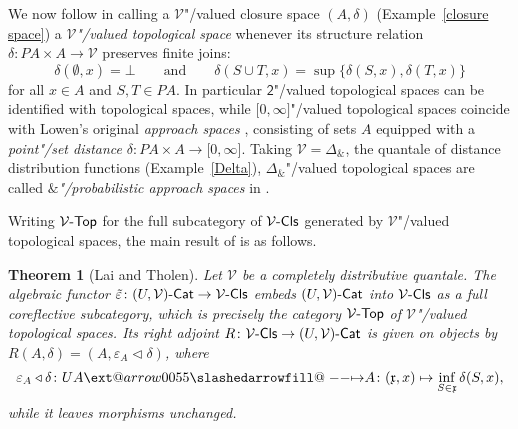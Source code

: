 \documentclass[preprint, a4paper]{elsarticle}
\makeatletter
\def\slashedarrowfill@#1#2#3#4#5{%
  $\m@th\thickmuskip0mu\medmuskip\thickmuskip\thinmuskip\thickmuskip
   \relax#5#1\mkern-7mu%
   \cleaders\hbox{$#5\mkern-2mu#2\mkern-2mu$}\hfill
   \mathclap{#3}\mathclap{#2}%
   \cleaders\hbox{$#5\mkern-2mu#2\mkern-2mu$}\hfill
   \mkern-7mu#4$%
}
\def\rightslashedarrowfill@{%
  \slashedarrowfill@\relbar\relbar\mapstochar\rightarrow}
\newcommand\xslashedrightarrow[2][]{%
  \ext@arrow 0055{\rightslashedarrowfill@}{#1}{#2}}
\def\slashedrightarrow{\xslashedrightarrow{}}
\newtheorem{theorem}{Theorem}[section]
\theoremstyle{definition}
\theoremstyle{remark}
\providecommand{\exref}[1]{Example~\ref{#1}}
\providecommand{\eps}{\varepsilon}
\providecommand{\mf}[1]{\mathfrak{#1}}
\providecommand{\bigbrcs}[1]{\bigl\lbrace #1 \bigr\rbrace}
\providecommand{\brks}[1]{\lbrack #1 \rbrack}
\providecommand{\union}{\cup}
\newcommand{\tn}{\mathbin\&}
\providecommand{\map}[3]{#1\colon#2\to#3}
\providecommand{\hmap}[3]{#1\colon#2\slashedrightarrow#3}
\providecommand{\catvar}[1]{\mathcal{#1}}
\providecommand{\2}{\mathsf 2}
\providecommand{\V}{\catvar V}
\providecommand{\Cat}{\mathsf{Cat}}
\providecommand{\enCat}[1]{#1\text-\Cat}
\providecommand{\vTop}[1]{#1\text-\mathsf{Top}}
\providecommand{\Cls}[1]{#1\text-\mathsf{Cls}}
\providecommand{\lhom}{\triangleleft}
\makeatother
\begin{document}
  We now follow \cite{Lai-Tholen17b} in calling a $\V$"/valued closure space $(A, \delta)$ (\exref{closure space}) a \emph{$\V$"/valued topological space} whenever its structure relation $\map\delta{PA \times A}\V$ preserves finite joins:
		\begin{equation} \label{preserve finite joins}
			\delta(\emptyset, x) = \bot \qquad \text{and} \qquad \delta(S \union T, x) = \sup\bigbrcs{\delta(S, x), \delta(T, x)}
		\end{equation}
		for all $x \in A$ and $S, T \in PA$. In particular $\2$"/valued topological spaces can be identified with topological spaces, while $\brks{0, \infty}$"/valued topological spaces coincide with Lowen's original \emph{approach spaces} \cite{Lowen97}, consisting of sets $A$ equipped with a \emph{point"/set distance} $\map\delta{PA \times A}{\brks{0, \infty}}$. Taking $\V = \Delta_{\tn}$, the quantale of distance distribution functions (\exref{Delta}), $\Delta_{\tn}$"/valued topological spaces are called \emph{$\tn$"/probabilistic approach spaces} in \cite{Lai-Tholen17b}.
		
		Writing $\vTop\V$ for the full subcategory of $\Cls\V$ generated by $\V$"/valued topological spaces, the main result of \cite{Lai-Tholen17a} is as follows.
  \begin{theorem}[Lai and Tholen] \label{V-valued topological space}
  	Let $\V$ be a completely distributive quantale. The algebraic functor $\map{\tilde \eps}{\enCat{(U, \V)}}{\Cls\V}$ embeds $\enCat{(U, \V)}$ into $\Cls\V$ as a full coreflective subcategory, which is precisely the category $\vTop\V$ of $\V$"/valued topological spaces. Its right adjoint $\map R{\Cls\V}{\enCat{(U, \V)}}$ is given on objects by $R(A, \delta) = (A, \eps_A \lhom \delta)$, where
  	\begin{displaymath}
  		\hmap{\eps_A \lhom \delta}{UA}A\colon (\mf x, x) \mapsto \inf_{S \in \mf x} \delta(S, x),
  	\end{displaymath}
  	while it leaves morphisms unchanged.
  \end{theorem}
  
\end{document}
